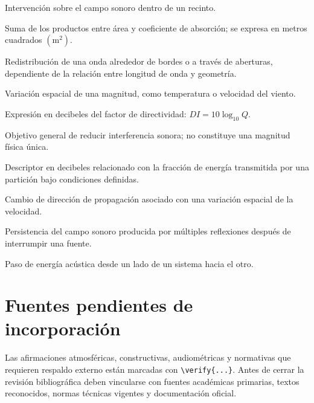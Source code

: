 \begin{description}[style=nextline]
    \item[Acondicionamiento acústico.]
    Intervención sobre el campo sonoro dentro de un recinto.

    \item[Área equivalente de absorción (\(A\)).]
    Suma de los productos entre área y coeficiente de absorción; se expresa en
    metros cuadrados \((\text{m}^2)\).

    \item[Difracción.]
    Redistribución de una onda alrededor de bordes o a través de aberturas,
    dependiente de la relación entre longitud de onda y geometría.

    \item[Gradiente.]
    Variación espacial de una magnitud, como temperatura o velocidad del
    viento.

    \item[Índice de directividad (\(DI\)).]
    Expresión en decibeles del factor de directividad:
    \(DI=10\log_{10}Q\).

    \item[Insonorización.]
    Objetivo general de reducir interferencia sonora; no constituye una
    magnitud física única.

    \item[Pérdida por transmisión.]
    Descriptor en decibeles relacionado con la fracción de energía transmitida
    por una partición bajo condiciones definidas.

    \item[Refracción.]
    Cambio de dirección de propagación asociado con una variación espacial de
    la velocidad.

    \item[Reverberación.]
    Persistencia del campo sonoro producida por múltiples reflexiones después
    de interrumpir una fuente.

    \item[Transmisión.]
    Paso de energía acústica desde un lado de un sistema hacia el otro.
\end{description}

\section{Fuentes pendientes de incorporación}
\label{sec:u9-fuentes}

Las afirmaciones atmosféricas, constructivas, audiométricas y normativas que
requieren respaldo externo están marcadas con \verb|\verify{...}|. Antes de
cerrar la revisión bibliográfica deben vincularse con fuentes académicas
primarias, textos reconocidos, normas técnicas vigentes y documentación
oficial.

